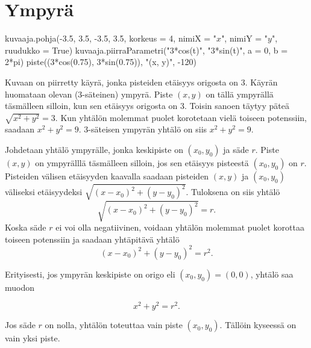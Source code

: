 \section{Ympyrä}


\begin{kuva}
    kuvaaja.pohja(-3.5, 3.5, -3.5, 3.5, korkeus = 4, nimiX = "$x$", nimiY = "$y$", ruudukko = True)
    kuvaaja.piirraParametri("3*cos(t)", "3*sin(t)", a = 0, b = 2*pi)
    piste((3*cos(0.75), 3*sin(0.75)), "(x, y)", -120)
\end{kuva}

Kuvaan on piirretty käyrä, jonka pisteiden etäisyys origosta on 3. Käyrän huomataan olevan ($3$-säteinen) ympyrä. Piste $(x, y)$ on tällä ympyrällä täsmälleen silloin, kun sen etäisyys origosta on 3. Toisin sanoen täytyy päteä $\sqrt{x^2+y^2}=3$. Kun yhtälön molemmat puolet korotetaan vielä toiseen potenssiin, saadaan $x^2+y^2=9$. $3$-säteisen ympyrän yhtälö on siis $x^2+y^2=9$.


Johdetaan yhtälö ympyrälle, jonka keskipiste on $(x_0, y_0)$ ja säde $r$. Piste $(x, y)$ on ympyrälllä täsmälleen silloin, jos sen etäisyys pisteestä $(x_0, y_0)$ on $r$. Pisteiden välisen etäisyyden kaavalla saadaan pisteiden $(x, y)$ ja $(x_0, y_0)$ väliseksi etäisyydeksi $\sqrt{(x-x_0)^2+(y-y_0)^2}$. Tuloksena on siis yhtälö
\[
\sqrt{(x-x_0)^2+(y-y_0)^2}=r.
\]
Koska säde $r$ ei voi olla negatiivinen, voidaan yhtälön molemmat puolet korottaa toiseen potenssiin ja saadaan yhtäpitävä yhtälö
\[
(x-x_0)^2+(y-y_0)^2=r^2.
\]

Erityisesti, jos ympyrän keskipiste on origo eli $(x_{0}, y_{0})= (0, 0)$, yhtälö saa muodon

\[
x^{2}+y^{2} = r^{2}.
\]


Jos säde $r$ on nolla, yhtälön toteuttaa vain piste $(x_{0}, y_{0})$. Tällöin kyseessä on vain yksi piste.




